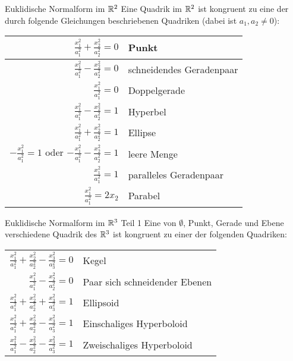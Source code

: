 \documentclass[main.tex]{subfiles}
\begin{document}
\begin{karte}{Euklidische Normalform im \(\mathbb{R}^2\)}
    Eine Quadrik im \( \mathbb{R}^2 \) ist kongruent zu 
    eine der durch folgende Gleichungen 
    beschriebenen Quadriken (dabei ist \(a_1, a_2 \neq 0\)):\\
    {\renewcommand{\arraystretch}{1.5}
    \begin{center}
        \begin{tabular}{|r|l|}
            \hline
            \( \frac{x_1^2}{a_1^2} + \frac{x_2^2}{a_2^2} = 0 \) & Punkt \\
            \hline
            \( \frac{x_1^2}{a_1^2} - \frac{x_2^2}{a_2^2} = 0 \) & schneidendes Geradenpaar \\
            \hline
            \( \frac{x_1^2}{a_1^2} = 0 \) & Doppelgerade \\
            \hline
            \( \frac{x_1^2}{a_1^2} - \frac{x_2^2}{a_2^2} = 1 \) & Hyperbel \\
            \hline 
            \( \frac{x_1^2}{a_1^2} + \frac{x_2^2}{a_2^2} = 1 \) & Ellipse \\
            \hline 
            \( - \frac{x_1^2}{a_1^2} = 1 \) oder \( - \frac{x_1^2}{a_1^2} - \frac{x_2^2}{a_2^2} = 1 \) & leere Menge \\
            \hline 
            \( \frac{x_1^2}{a_1^2} = 1 \) & paralleles Geradenpaar \\
            \hline 
            \( \frac{x_1^2}{a_1^2} = 2x_2 \) & Parabel \\
            \hline
        \end{tabular}
    \end{center}}
\end{karte}

\begin{karte}{Euklidische Normalform im \( \mathbb{R}^3 \) Teil 1}
    Eine von \( \emptyset \), Punkt, Gerade und Ebene verschiedene Quadrik des 
    \( \mathbb{R}^3 \) ist kongruent zu einer der folgenden Quadriken: 
    {\renewcommand{\arraystretch}{1.5}
    \begin{center}
    \begin{tabular}{|r|l|}
        \hline
        \( \frac{x_1^2}{a_1^2} + \frac{x_2^2}{a_2^2} - \frac{x_3^2}{a_3^2} = 0 \) & Kegel \\
        \( \frac{x_1^2}{a_1^2} - \frac{x_2^2}{a_2^2} = 0 \) & Paar sich schneidender Ebenen \\
        \hline 
        \( \frac{x_1^2}{a_1^2} + \frac{x_2^2}{a_2^2} + \frac{x_3^2}{a_3^2} = 1 \) & Ellipsoid \\
        \( \frac{x_1^2}{a_1^2} + \frac{x_2^2}{a_2^2} - \frac{x_3^2}{a_3^2} = 1 \) & Einschaliges Hyperboloid \\
        \( \frac{x_1^2}{a_1^2} - \frac{x_2^2}{a_2^2} - \frac{x_3^2}{a_3^2} = 1 \) & Zweischaliges Hyperboloid \\
        \hline
    \end{tabular}
    \end{center}}
\end{karte}
\end{document}
